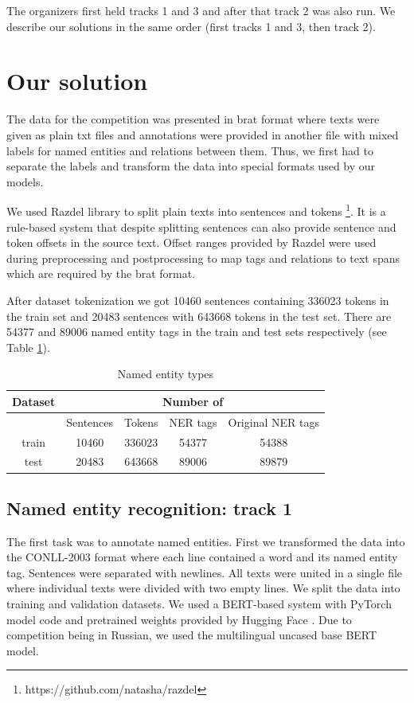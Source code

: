 \documentclass{dialogue}
\begin{document}
The organizers first held tracks 1 and 3 and after that track 2 was also run. We describe our solutions in the same order (first tracks 1 and 3, then track 2).
\section{Our solution}
The data for the competition was presented in brat format \cite{brat} where texts were given as plain txt files and annotations were provided in another file with mixed labels for named entities and relations between them. Thus, we first had to separate the labels and transform the data into special formats used by our models.

We used Razdel library to split plain texts into sentences and tokens \footnote{https://github.com/natasha/razdel}. It is a rule-based system that despite splitting sentences can also provide sentence and token offsets in the source text. Offset ranges provided by Razdel were used during preprocessing and postprocessing to map tags and relations to text spans which are required by the brat format.

After dataset tokenization we got 10460 sentences containing 336023 tokens in the train set and 20483 sentences with 643668 tokens in the test set. There are 54377 and 89006 named entity tags in the train and test sets respectively (see Table \ref{tab:tokenization}).

\begin{table}[bth]
	\centering
	\begin{tabular}{c|c|c|c|c}
		\hline
		\multicolumn{1}{c|}{Dataset} &
		\multicolumn{4}{c}{Number of} \\  \hline
		& Sentences& Tokens & NER tags & Original NER tags\\ \hline
	train & 10460 & 336023 & 54377 & 54388\\ \hline
	test & 20483 & 643668 & 89006 & 89879\\ \hline
	\end{tabular}
	\caption{Named entity types}
	\label{tab:tokenization}
\end{table}

\subsection{Named entity recognition: track 1}
The first task was to annotate named entities. First we transformed the data into the CONLL-2003 format where each line contained a word and its named entity tag. Sentences were separated with newlines. All texts were united in a single file where individual texts were divided with two empty lines. We split the data into training and validation datasets. We used a BERT-based system \cite{bert} with PyTorch model code and pretrained weights provided by Hugging Face \cite{Wolf2019HuggingFacesTS}. Due to competition being in Russian, we used the multilingual uncased base BERT model.
\end{document}
